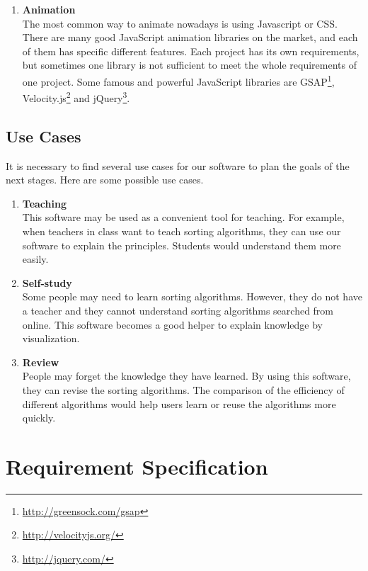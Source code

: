 \documentclass[paper=a4, fontsize=11pt,twoside]{scrartcl}		%
\begin{document}
\begin{enumerate}
	\item \textbf{Animation}\\
The most common way to animate nowadays is using Javascript or CSS. There are many good JavaScript animation libraries on the market, and each
of them has specific different features. Each project has its own requirements,
but sometimes one library is not sufficient to meet the whole requirements of one
project. Some famous and powerful JavaScript libraries are GSAP\footnote{\url{http://greensock.com/gsap}}, Velocity.js\footnote{\url{http://velocityjs.org/}} and jQuery\footnote{\url{http://jquery.com/}}.

	
\end{enumerate}


\subsection{Use Cases}
It is necessary to find several use cases for our software to plan the goals of the next stages. Here are some possible use cases.
\begin{enumerate}
\item \textbf{Teaching}\\
This software may be used as a convenient tool for teaching. For example, when teachers in class want to teach sorting algorithms, they can use our software to explain the principles. Students would understand them more easily.

\item \textbf{Self-study}\\
Some people may need to learn sorting algorithms. However, they do not have a teacher and they cannot understand sorting algorithms searched from online. This software becomes a good helper to explain knowledge by visualization.

\item \textbf{Review}\\
People may forget the knowledge they have learned. By using this software, they can revise the sorting algorithms. The comparison of the efficiency of different algorithms would help users learn or reuse the algorithms more quickly.
\end{enumerate}



\section{Requirement Specification}
\end{document}
